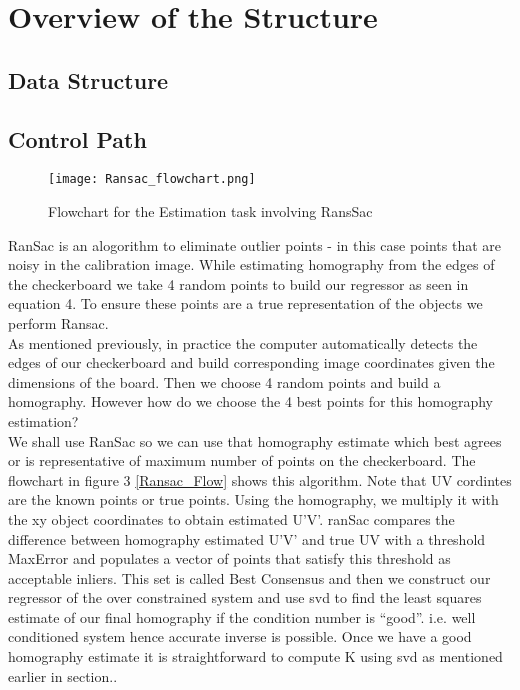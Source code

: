 \documentclass[titlepage]{article}
\begin{document}
\section{Overview of the Structure}
\subsection{Data Structure}
\subsection{Control Path}
\begin{wrapfigure}{R}{5.5cm}
  \label{Ransac_Flow}
  \caption{Flowchart for the Estimation task involving RansSac}\label{wrap-fig:1}
  \texttt{[image: Ransac\_flowchart.png]}
\end{wrapfigure} 
RanSac is an alogorithm to eliminate outlier points - in this case points that are noisy in the calibration image. While estimating homography from the edges of the checkerboard we take 4 random points to build our regressor \Phi as seen in equation 4. To ensure these points are a true representation of the objects we perform Ransac.\\
As mentioned previously, in practice the computer automatically detects the edges of our checkerboard and build corresponding image coordinates given the dimensions of the board.
Then we choose 4 random points and build a homography. However how do we choose the 4 best points for this homography estimation? \\
We shall use RanSac so we can use that homography estimate which best agrees or is representative of maximum number of points on the checkerboard. The flowchart in figure 3 \ref{Ransac_Flow} shows this algorithm. Note that UV cordintes are the known points or true points. Using the homography, we multiply it with the xy object coordinates to obtain estimated U’V’. ranSac compares the difference between homography estimated U’V’ and true UV with a threshold MaxError  and populates a vector of points that satisfy this threshold as acceptable inliers. This set is called Best Consensus and then we construct our regressor of the over constrained system and use svd to find the least squares estimate of our final homography if the condition number is “good”. i.e. well conditioned system hence accurate inverse is possible. Once we have a good homography estimate it is straightforward to compute K using svd as mentioned earlier in section..
\end{document}

